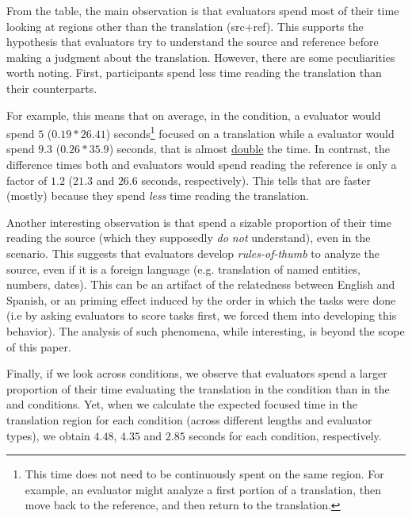 From the table, the main observation is that evaluators spend most of their time looking at regions other than the translation (src+ref). This supports the hypothesis that evaluators try to understand the source and reference before making a judgment about the translation. However, there are some peculiarities worth noting. First, \bil participants spend less time reading the translation than their \mono counterparts. %
\\
\pagebreak
\vspace{10pt}

For example, this means that on average, in the \tgt condition, a \bil evaluator would spend  $5$ ($0.19*26.41$) seconds\footnote{This time does not need to be continuously spent on the same region. For example, an evaluator might analyze a first portion of a translation, then move back to the reference, and then return to the translation.} focused on a \llong translation while a \mono evaluator would spend $9.3$ ($0.26*35.9$) seconds, that is almost \underline{double} the time. In contrast, the difference times both \bil and \mono evaluators would spend reading the reference is only a factor of $1.2$ ($21.3$ and $26.6$ seconds, respectively). This tells that \bils are faster (mostly) because they spend \emph{less} time reading the translation.

Another interesting observation is that \monos spend a sizable proportion of their time reading the source (which they supposedly \emph{do not} understand), even in the \srctgt scenario. This suggests that \mono evaluators develop \emph{rules-of-thumb} to analyze the source, even if it is a foreign language (e.g. translation of named entities, numbers, dates). This can be an artifact of the relatedness between English and Spanish, or an priming effect induced by the order in which the tasks were done (i.e by asking \mono evaluators to score \src tasks first, we forced them into developing this behavior). The analysis of such phenomena, while interesting, is beyond the scope of this paper.

Finally, if we look across conditions, we observe that evaluators spend a larger proportion of their time evaluating the translation in the \tgt condition than in the \src and \srctgt conditions. Yet, when we calculate the expected focused time in the translation region for each condition (across different lengths and evaluator types), we obtain $4.48$, $4.35$ and $2.85$ seconds for each condition, respectively. \\


